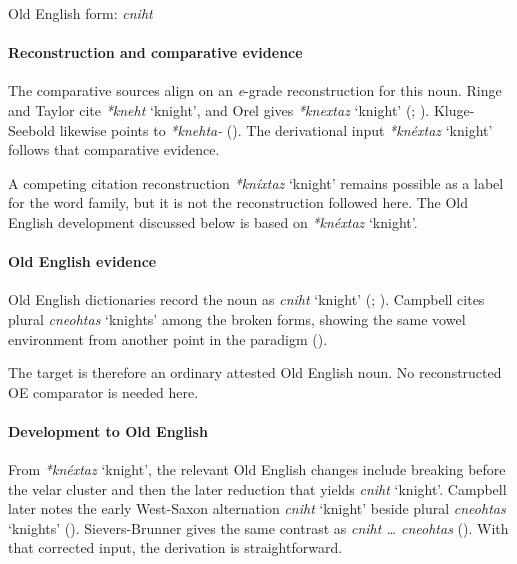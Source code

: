 \documentclass[
  british,
  a4paper,
]{article}
\providecommand{\Recon}[1]{\emph{*#1}}
\begin{document}
Old English form: \emph{cniht}

\paragraph{Reconstruction and comparative
evidence}\label{reconstruction-and-comparative-evidence-91}

The comparative sources align on an \emph{e}-grade reconstruction for
this noun. Ringe and Taylor cite \Recon{kneht} `knight', and Orel gives
\Recon{knextaz} `knight' (; ).
Kluge-Seebold likewise points to \emph{*knehta-}
(). The derivational
input \Recon{knéxtaz} `knight' follows that comparative evidence.

A competing citation reconstruction \Recon{kníxtaz} `knight' remains
possible as a label for the word family, but it is not the
reconstruction followed here. The Old English development discussed
below is based on \Recon{knéxtaz} `knight'.

\paragraph{Old English evidence}\label{old-english-evidence-91}

Old English dictionaries record the noun as {\emph{cniht}} `knight'
(;
).
Campbell cites plural {\emph{cneohtas}} `knights' among the broken
forms, showing the same vowel environment from another point in the
paradigm ().

The target is therefore an ordinary attested Old English noun. No
reconstructed OE comparator is needed here.

\paragraph{Development to Old
English}\label{development-to-old-english-91}

From \Recon{knéxtaz} `knight', the relevant Old English changes include
breaking before the velar cluster and then the later reduction that
yields {\emph{cniht}} `knight'. Campbell later notes the early
West-Saxon alternation {\emph{cniht}} `knight' beside plural
{\emph{cneohtas}} `knights' (). Sievers-Brunner gives the same contrast as \emph{cniht
\ldots{} cneohtas} (). With that corrected input, the derivation is
straightforward.
\end{document}
